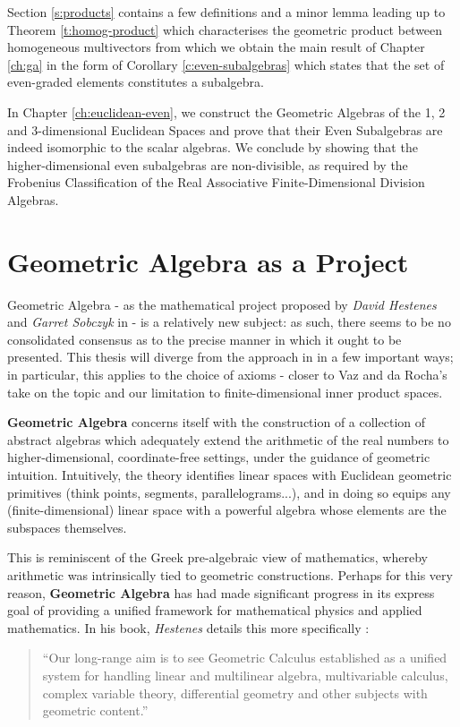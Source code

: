 Section \ref{s:products} contains a few definitions and a minor lemma leading up to Theorem \ref{t:homog-product} which characterises the geometric product between homogeneous multivectors from which we obtain the main result of Chapter \ref{ch:ga} in the form of Corollary \ref{c:even-subalgebras} which states that the set of even-graded elements constitutes a subalgebra.

In Chapter \ref{ch:euclidean-even}, we construct the Geometric Algebras of the 1, 2 and 3-dimensional Euclidean Spaces and prove that their Even Subalgebras are indeed isomorphic to the scalar algebras. We conclude by showing that the higher-dimensional even subalgebras are non-divisible, as required by the Frobenius Classification of the Real Associative Finite-Dimensional Division Algebras.


\section{Geometric Algebra as a Project}
Geometric Algebra - as the mathematical project proposed by \textit{David Hestenes} and \textit{Garret Sobczyk} in \cite{ga-origin} - is a relatively new subject: as such, there seems to be no consolidated consensus as to the precise manner in which it ought to be presented. This thesis will diverge from the approach in \cite{ga-origin} in a few important ways; in particular, this applies to the choice of axioms - closer to Vaz and da Rocha's take on the topic \cite{clifford-algebra} and our limitation to finite-dimensional inner product spaces.

\textbf{Geometric Algebra} concerns itself with the construction of a collection of abstract algebras which adequately extend the arithmetic of the real numbers to higher-dimensional, coordinate-free settings, under the guidance of geometric intuition. Intuitively, the theory identifies linear spaces with Euclidean geometric primitives (think points, segments, parallelograms...), and in doing so equips any (finite-dimensional) linear space with a powerful algebra whose elements are the subspaces themselves.

This is reminiscent of the Greek pre-algebraic view of mathematics, whereby arithmetic was intrinsically tied to geometric constructions.
Perhaps for this very reason, \textbf{Geometric Algebra} has had made significant progress in its express goal of providing a unified framework for mathematical physics and applied mathematics. In his book, \textit{Hestenes} details this more specifically \cite[p. ix]{ga-origin}:

\begin{quote}
	``Our long-range aim is to see Geometric Calculus established as a unified system for handling linear and multilinear algebra, multivariable calculus, complex variable theory, differential geometry and other subjects with geometric content.''
\end{quote}
